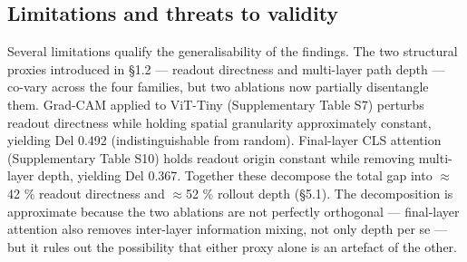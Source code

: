 \documentclass[11pt,a4paper]{article}
\begin{document}
\subsection{Limitations and threats to validity}

Several limitations qualify the generalisability of the findings. The two structural proxies introduced in \S{}1.2 --- readout directness and multi-layer path depth --- co-vary across the four families, but two ablations now partially disentangle them. Grad-CAM applied to ViT-Tiny (Supplementary Table S7) perturbs readout directness while holding spatial granularity approximately constant, yielding Del 0.492 (indistinguishable from random). Final-layer CLS attention (Supplementary Table S10) holds readout origin constant while removing multi-layer depth, yielding Del 0.367. Together these decompose the total gap into $\approx$42 \% readout directness and $\approx$52 \% rollout depth (\S{}5.1). The decomposition is approximate because the two ablations are not perfectly orthogonal --- final-layer attention also removes inter-layer information mixing, not only depth per se --- but it rules
out the possibility that either proxy alone is an artefact of the other.
\end{document}
